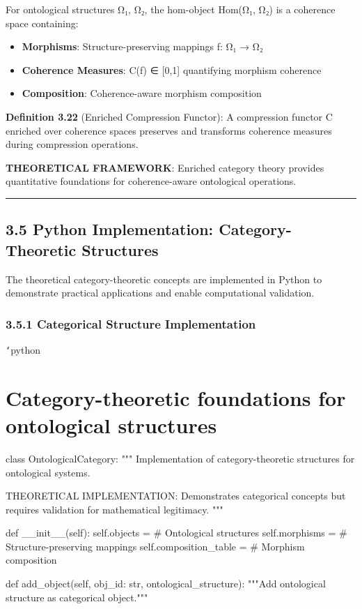 For ontological structures Ω₁, Ω₂, the hom-object Hom(Ω₁, Ω₂) is a coherence space containing:
\begin{itemize}
\item \textbf{Morphisms}: Structure-preserving mappings f: Ω₁ → Ω₂
\item \textbf{Coherence Measures}: C(f) ∈ [0,1] quantifying morphism coherence
\item \textbf{Composition}: Coherence-aware morphism composition
\end{itemize}

\textbf{Definition 3.22} (Enriched Compression Functor): A compression functor C enriched over coherence spaces preserves and transforms coherence measures during compression operations.

\textbf{THEORETICAL FRAMEWORK}: Enriched category theory provides quantitative foundations for coherence-aware ontological operations.

\hrule

\section{3.5 Python Implementation: Category-Theoretic Structures}

The theoretical category-theoretic concepts are implemented in Python to demonstrate practical applications and enable computational validation.

\subsection{3.5.1 Categorical Structure Implementation}

\texttt{`}python
\chapter{Category-theoretic foundations for ontological structures}
class OntologicalCategory:
    """
    Implementation of category-theoretic structures for ontological systems.
    
    THEORETICAL IMPLEMENTATION: Demonstrates categorical concepts
    but requires validation for mathematical legitimacy.
    """
    
    def __init__(self):
        self.objects = {}  \# Ontological structures
        self.morphisms = {}  \# Structure-preserving mappings
        self.composition_table = {}  \# Morphism composition
        
    def add_object(self, obj_id: str, ontological_structure):
        """Add ontological structure as categorical object."""
        
